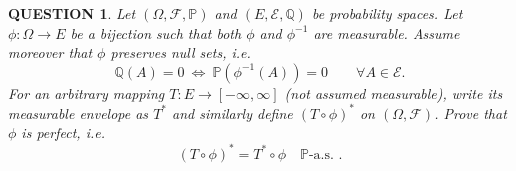 \documentclass[12pt]{article}
\renewcommand{\(}{\left(}%
\renewcommand{\)}{\right)}%
\renewcommand{\[}{\left[}%
\renewcommand{\]}{\right]}%
\newcommand{\p}{\mathbb{P}}
\newcommand{\f}{\mathscr{F}}
\newtheorem{question}{QUESTION}[section]}
\begin{document}
\begin{question}
Let $(\Omega ,\f ,\p )$ and $( E ,\mathscr{E},\mathbb{Q})$ be probability spaces.
Let $\phi:\Omega \to E $ be a bijection such that both $\phi$ and $\phi^{-1}$ are measurable.
Assume moreover that $\phi$ preserves null sets, i.e.
\begin{equation*}
\mathbb{Q}(A)=0 \ \Longleftrightarrow\ \p (\phi^{-1}(A))=0
\qquad \forall A\in\mathscr{E} .
\end{equation*}
For an arbitrary mapping $T: E \to[-\infty,\infty]$ (not assumed measurable), write its measurable envelope as $T^*$ and similarly define $(T\circ\phi)^*$ on $(\Omega ,\f )$.
Prove that $\phi$ is \emph{perfect}, i.e.
\begin{equation*}
(T\circ\phi)^* = T^*\circ\phi \quad \p\text{-a.s. }.
\end{equation*}
\end{question}
\end{document}
